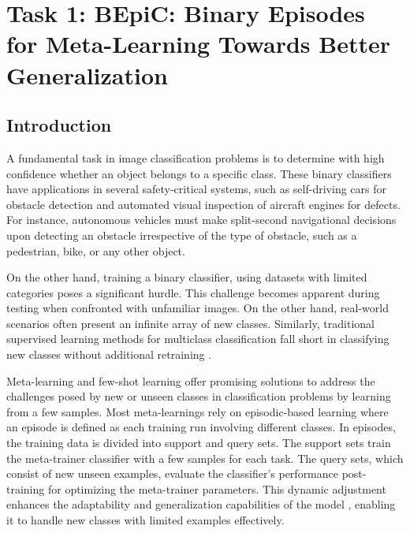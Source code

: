 \section{Task 1: BEpiC: Binary Episodes for Meta-Learning Towards Better Generalization}

\subsection{Introduction}

A fundamental task in image classification problems is to determine with high confidence whether an object belongs to a specific class. These binary classifiers have applications in several safety-critical systems, such as self-driving cars for obstacle detection and automated visual inspection of aircraft engines for defects. For instance, autonomous vehicles must make split-second navigational decisions upon detecting an obstacle irrespective of the type of obstacle, such as a pedestrian, bike, or any other object.

On the other hand, training a binary classifier, using datasets with limited categories poses a significant hurdle. This challenge becomes apparent during testing when confronted with unfamiliar images. On the other hand, real-world scenarios often present an infinite array of new classes. Similarly, traditional supervised learning methods for multiclass classification fall short in classifying new classes without additional retraining \cite{ye2021meta}. 

Meta-learning and few-shot learning \cite{Chen_2021_ICCV} offer promising solutions to address the challenges posed by new or unseen classes in classification problems by learning from a few samples. Most meta-learnings rely on episodic-based learning where an episode is defined as each training run involving different classes. In episodes, the training data is divided into support and query sets. The support sets train the meta-trainer classifier with a few samples for each task. The query sets, which consist of new unseen examples, evaluate the classifier's performance post-training for optimizing the meta-trainer parameters. This dynamic adjustment enhances the adaptability and generalization capabilities of the model \cite{sandler2021meta}, enabling it to handle new classes with limited examples effectively.

